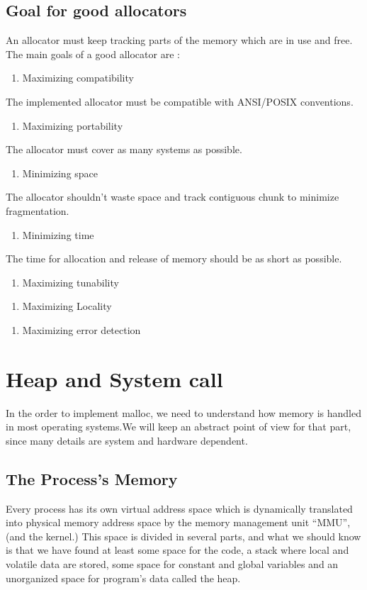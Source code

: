 \subsection{Goal for good allocators}
An allocator must keep tracking parts of the memory which are in use and free.
The main goals of a good allocator are \cite{Lea12}:
\begin{enumerate}
\item Maximizing compatibility
\end{enumerate}
The implemented allocator must be compatible with ANSI/POSIX conventions.

\begin{enumerate}
\item Maximizing portability
\end{enumerate}
The allocator must cover as many systems as possible.
\begin{enumerate}
\item Minimizing space
\end{enumerate}
The allocator shouldn't waste space and track contiguous chunk to minimize fragmentation.

\begin{enumerate}
\item Minimizing time
\end{enumerate}
The time for allocation and release of memory should be as short as possible.

\begin{enumerate}
\item Maximizing tunability
\end{enumerate}

\begin{enumerate}
\item Maximizing Locality
\end{enumerate}

\begin{enumerate}
\item Maximizing error detection
\end{enumerate}
\section{Heap and System call}
In the order to implement malloc, we need to understand how memory is handled in most operating systems.We will keep an abstract point of view for that part, since many details are system and
hardware dependent.

\subsection{The Process’s Memory}
Every process has its own virtual address space which is dynamically translated into physical memory  address space by the memory management unit ``MMU'', (and the kernel.) This space is divided in several parts, and what we should know is that we have found at least some space for the code, a stack where local and volatile data are stored, some space for constant and global variables and an unorganized space for program’s data called the heap.\\

